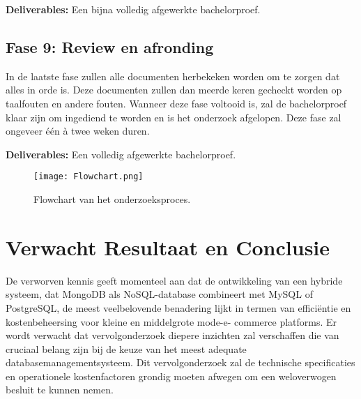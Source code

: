 \textbf{Deliverables:} Een bijna volledig afgewerkte bachelorproef.

\subsection{Fase 9: Review en afronding}
\label{subsec:reviewenafronding}
In de laatste fase zullen alle documenten herbekeken worden om te zorgen dat alles in orde is. Deze
documenten zullen dan meerde keren gecheckt worden op taalfouten en andere fouten. Wanneer deze fase voltooid is, zal de bachelorproef klaar zijn om ingediend te worden en is het onderzoek afgelopen. Deze fase zal ongeveer één à
twee weken duren.

\textbf{Deliverables:} Een volledig afgewerkte bachelorproef.

\begin{figure}[htbp]
    \centering
    \texttt{[image: Flowchart.png]}
    \caption{Flowchart van het onderzoeksproces.}
    \label{fig:flowchart}
\end{figure}


\section{Verwacht Resultaat en Conclusie}%
\label{sec:verwachte_resultaten}

De verworven kennis geeft momenteel aan dat de ontwikkeling van een hybride systeem, dat
MongoDB als NoSQL-database combineert met MySQL of PostgreSQL, de meest veelbelovende
benadering lijkt in termen van efficiëntie en kostenbeheersing voor kleine en middelgrote mode-e-
commerce platforms. Er wordt verwacht dat vervolgonderzoek diepere inzichten zal verschaffen die
van cruciaal belang zijn bij de keuze van het meest adequate databasemanagementsysteem. Dit
vervolgonderzoek zal de technische specificaties en operationele kostenfactoren grondig moeten
afwegen om een weloverwogen besluit te kunnen nemen.



